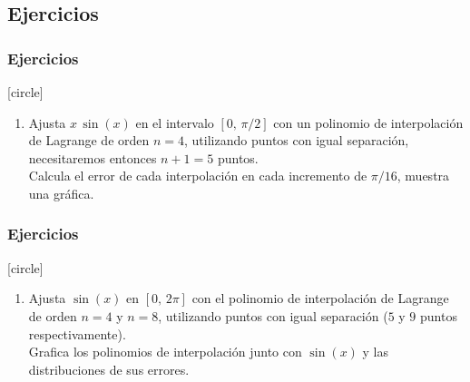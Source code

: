 \subsection{Ejercicios}
\begin{frame}
\frametitle{Ejercicios}
[circle]
\begin{enumerate}
\item Ajusta $x \, \sin(x)$ en el intervalo $[0, \, \pi/2]$ con un polinomio de interpolación de Lagrange de orden $n = 4$, utilizando puntos con igual separación, necesitaremos entonces $n + 1 = 5$ puntos.
\\
\bigskip
Calcula el error de cada interpolación en cada incremento de $\pi/16$, muestra una gráfica.
\seti
\end{enumerate}
\end{frame}
\begin{frame}
\frametitle{Ejercicios}
[circle]
\begin{enumerate}
\conti
\item Ajusta $\sin(x)$ en $[0, \, 2\pi]$ con el polinomio de interpolación de Lagrange de orden $n = 4$ y $n = 8$, utilizando puntos con igual separación ($5$ y $9$ puntos respectivamente). 
\\
\bigskip
Grafica los polinomios de interpolación junto con $\sin(x)$ y las distribuciones de sus errores.
\end{enumerate}
\end{frame}
